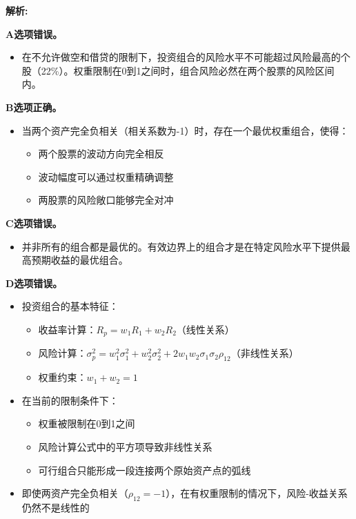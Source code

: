 \documentclass{article}
\newenvironment{explanation}
{\textbf{解析:}\par}
{\par}
\begin{document}
\begin{explanation}
    \textbf{A选项错误。}
    \begin{itemize}
        \item 在不允许做空和借贷的限制下，投资组合的风险水平不可能超过风险最高的个股（22\%）。权重限制在0到1之间时，组合风险必然在两个股票的风险区间内。
    \end{itemize}

    \textbf{B选项正确。}
    \begin{itemize}
        \item 当两个资产完全负相关（相关系数为-1）时，存在一个最优权重组合，使得：
        \begin{itemize}
            \item 两个股票的波动方向完全相反
            \item 波动幅度可以通过权重精确调整
            \item 两股票的风险敞口能够完全对冲
        \end{itemize}
    \end{itemize}

    \textbf{C选项错误。}
    \begin{itemize}
        \item 并非所有的组合都是最优的。有效边界上的组合才是在特定风险水平下提供最高预期收益的最优组合。
    \end{itemize}

    \textbf{D选项错误。}
    \begin{itemize}
        \item 投资组合的基本特征：
            \begin{itemize}
                \item 收益率计算：$R_p = w_1R_1 + w_2R_2$（线性关系）
                \item 风险计算：$\sigma_p^2 = w_1^2\sigma_1^2 + w_2^2\sigma_2^2 + 2w_1w_2\sigma_1\sigma_2\rho_{12}$（非线性关系）
                \item 权重约束：$w_1 + w_2 = 1$
            \end{itemize}
        
        \item 在当前的限制条件下：
            \begin{itemize}
                \item 权重被限制在0到1之间
                \item 风险计算公式中的平方项导致非线性关系
                \item 可行组合只能形成一段连接两个原始资产点的弧线
            \end{itemize}
        
        \item 即使两资产完全负相关（$\rho_{12} = -1$），在有权重限制的情况下，风险-收益关系仍然不是线性的
    \end{itemize}
\end{explanation}
\end{document}
